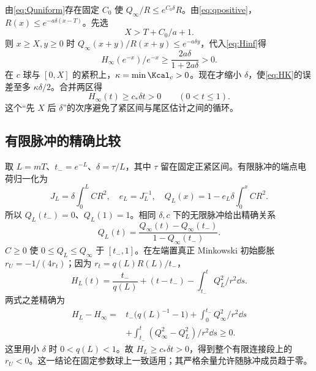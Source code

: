 由\eqref{eq:Quniform}存在固定 $C_0$ 使 $Q_\infty/R\le e^{C_0\delta}R$。由\eqref{eq:qpositive}，$R(x)\le e^{-a\delta(x-T)}$。先选
\begin{equation}\label{eq:Xchoose}
X>T+C_0/a+1.
\end{equation}
则 $x\ge X,y\ge0$ 时 $Q_\infty(x+y)/R(x+y)\le e^{-a\delta y}$，代入\eqref{eq:Hinf}得
\begin{equation}\label{eq:tail-H}
H_\infty(e^{-x})/e^{-x}\ge\frac{2a\delta}{1+2a\delta}>0.
\end{equation}
在 $c$ 球与 $[0,X]$ 的紧积上，$\kappa=\min\Kcal_c>0$。现在才缩小 $\delta$，使\eqref{eq:HK}的误差至多 $\kappa\delta/2$。合并两区得
\begin{equation}\label{eq:Hinf-lower}
H_\infty(t)\ge c_*\delta t>0\qquad(0<t\le1).
\end{equation}
这个“先 $X$ 后 $\delta$”的次序避免了紧区间与尾区估计之间的循环。

\subsection{有限脉冲的精确比较}
取 $L=mT$、$t_-=e^{-L}$、$\delta=\tau/L$，其中 $\tau$ 留在固定正紧区间。有限脉冲的端点电荷归一化为
\begin{equation}\label{eq:finite-charge}
J_L=\delta\int_0^LCR^2,\quad e_L=J_L^{-1},\quad
Q_L(x)=1-e_L\delta\int_0^xCR^2.
\end{equation}
所以 $Q_L(t_-)=0$、$Q_L(1)=1$。相同 $\delta,c$ 下的无限脉冲给出精确关系
\begin{equation}\label{eq:Qcomparison}
Q_L(t)=\frac{Q_\infty(t)-Q_\infty(t_-)}{1-Q_\infty(t_-)}.
\end{equation}
$C\ge0$ 使 $0\le Q_L\le Q_\infty$ 于 $[t_-,1]$。在左端置真正 Minkowski 初始膨胀 $r_U=-1/(4r_t)$；因为 $r_t=q(L)R(L)/t_-$，
\begin{equation}\label{eq:HL}
H_L(t)=\frac{t_-}{q(L)}+(t-t_-)-\int_{t_-}^tQ_L^2/r^2\dd s.
\end{equation}
两式之差精确为
\begin{equation}\label{eq:Hcomparison}
\begin{aligned}
H_L-H_\infty={}&t_-\bigl(q(L)^{-1}-1\bigr)
+\int_0^{t_-}Q_\infty^2/r^2\dd s\\
&+\int_{t_-}^t(Q_\infty^2-Q_L^2)/r^2\dd s\ge0.
\end{aligned}
\end{equation}
这里用小 $\delta$ 时 $0<q(L)<1$。故 $H_L\ge c_*\delta t>0$，得到整个有限连接段上的 $r_U<0$。这一结论在固定参数球上一致适用；其严格余量允许随脉冲成员趋于零。
